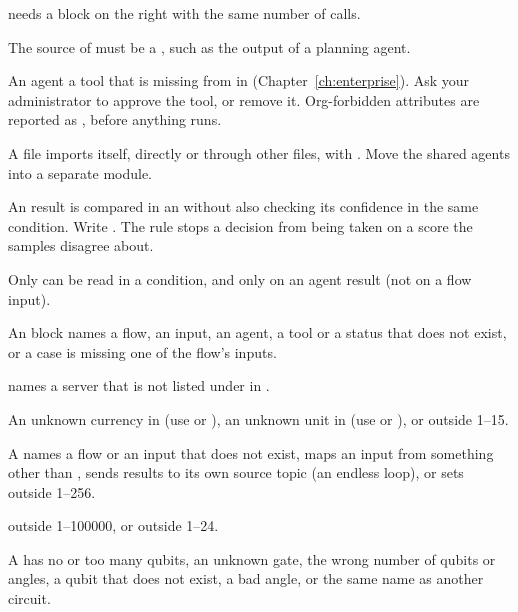  needs a  block on the right with the same number of calls.

The source of  must be a , such as the output of a planning agent.

An agent  a tool that is missing from  in  (Chapter~\ref{ch:enterprise}). Ask your administrator to approve the tool, or remove it. Org-forbidden attributes are reported as , before anything runs.

A file imports itself, directly or through other files, with . Move the shared agents into a separate module.

An  result is compared in an  without also checking its confidence in the same condition. Write . The rule stops a decision from being taken on a score the samples disagree about.

Only  can be read in a condition, and only on an agent result (not on a flow input).

An  block names a flow, an input, an agent, a tool or a status that does not exist, or a case is missing one of the flow's inputs.

 names a server that is not listed under  in .

An unknown currency in  (use  or ), an unknown unit in  (use  or ), or  outside 1--15.

A  names a flow or an input that does not exist, maps an input from something other than , sends results to its own source topic (an endless loop), or sets  outside 1--256.

 outside 1--100000, or  outside 1--24.

A  has no or too many qubits, an unknown gate, the wrong number of qubits or angles, a qubit that does not exist, a bad angle, or the same name as another circuit.

